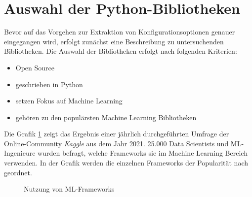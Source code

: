 \documentclass[german,bachelor]{swsLeipzig}
\begin{document}
\section{Auswahl der Python-Bibliotheken}\label{choice}
Bevor auf das Vorgehen zur Extraktion von Konfigurationsoptionen genauer eingegangen wird, erfolgt zunächst eine Beschreibung
zu untersuchenden Bibliotheken.
Die Auswahl der Bibliotheken erfolgt nach folgenden Kriterien:
\begin{itemize}
 \item Open Source
 \item geschrieben in Python
 \item setzen Fokus auf Machine Learning
 \item gehören zu den populärsten Machine Learning Bibliotheken
\end{itemize}

\noindent Die Grafik \ref{fig:kaggle} zeigt das Ergebnis einer jährlich durchgeführten Umfrage der Online-Community \textit{Kaggle}
aus dem Jahr 2021.
25.000 Data Scientists und ML-Ingenieure wurden befragt, welche Frameworks sie im Machine Learning Bereich verwenden.
In der Grafik werden die einzelnen Frameworks der Popularität nach geordnet.\\

\begin{figure}[H]
\begin{center}
\caption{Nutzung von ML-Frameworks \cite[]{kaggle}} \label{fig:kaggle}
\end{center}
\end{figure}
\end{document}
